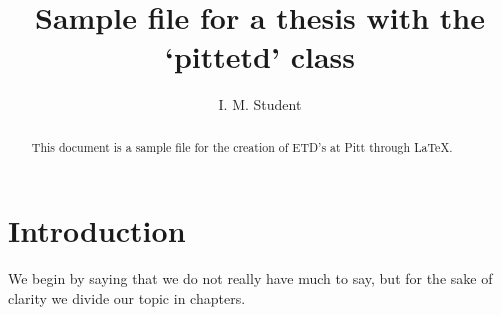 \documentclass[dvipdfm,final]{pittetd}%
\title[A pittetd-thesis sample]{Sample file for a thesis with the `pittetd' class}%
\author{I. M. Student}
\begin{document}
\maketitle
%
\makecommittee
\begin{abstract}
This document is a sample file for the creation of ETD's at Pitt through \LaTeX.
\end{abstract}
\tableofcontents
%
%
\chapter{Introduction}%
We begin by saying that we do not really have much to say, but for the sake of clarity we divide our topic in chapters.
\end{document}
